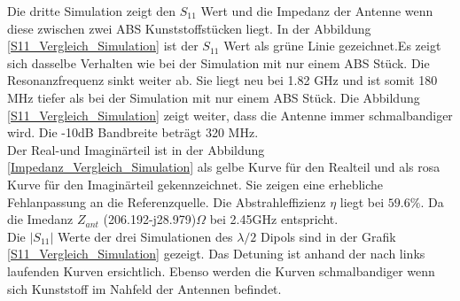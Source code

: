 Die dritte Simulation zeigt den $S_{11}$ Wert und die Impedanz der Antenne wenn diese zwischen zwei ABS Kunststoffstücken liegt. In der Abbildung \ref{S11_Vergleich_Simulation} ist der $S_{11}$ Wert als grüne Linie gezeichnet.Es zeigt sich dasselbe Verhalten wie bei der Simulation mit nur einem ABS Stück. Die Resonanzfrequenz sinkt weiter ab. Sie liegt neu bei 1.82 GHz und ist somit 180 MHz tiefer als bei der Simulation mit nur einem ABS Stück. Die Abbildung  \ref{S11_Vergleich_Simulation} zeigt weiter, dass die Antenne immer schmalbandiger wird. Die -10dB Bandbreite beträgt 320 MHz.\\
Der Real-und Imaginärteil ist in der Abbildung \ref{Impedanz_Vergleich_Simulation} als gelbe Kurve für den Realteil und als rosa Kurve für den Imaginärteil gekennzeichnet. Sie zeigen eine erhebliche Fehlanpassung an die Referenzquelle. Die Abstrahleffizienz $\eta$ liegt  bei $59.6 \%$. Da die Imedanz $Z_{ant}$ (206.192-j28.979)$\Omega$ bei 2.45GHz entspricht.\\




Die $|S_{11}|$ Werte der drei Simulationen des $\lambda/2$ Dipols sind in der Grafik \ref{S11_Vergleich_Simulation} gezeigt. Das Detuning ist anhand der nach links laufenden Kurven ersichtlich. Ebenso werden die Kurven schmalbandiger wenn sich Kunststoff im Nahfeld der Antennen befindet.

